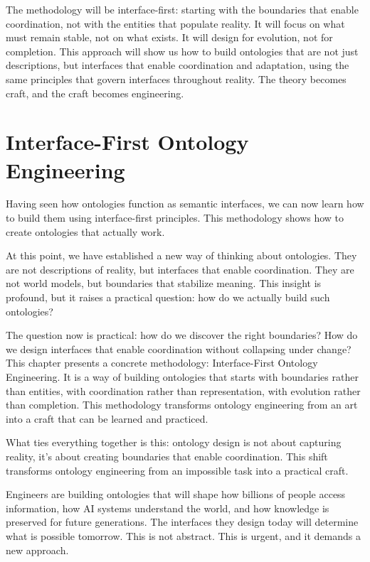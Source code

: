 \documentclass[
  openright]{book}
\begin{document}
The methodology will be interface-first: starting with the boundaries
that enable coordination, not with the entities that populate reality.
It will focus on what must remain stable, not on what exists. It will
design for evolution, not for completion. This approach will show us how
to build ontologies that are not just descriptions, but interfaces that
enable coordination and adaptation, using the same principles that
govern interfaces throughout reality. The theory becomes craft, and the
craft becomes engineering.

\chapter{\texorpdfstring{Interface-First Ontology
Engineering}{Interface-First Ontology Engineering}}\label{interface-first-ontology-engineering}

Having seen how ontologies function as semantic interfaces, we can now
learn how to build them using interface-first principles. This
methodology shows how to create ontologies that actually work.

At this point, we have established a new way of thinking about
ontologies. They are not descriptions of reality, but interfaces that
enable coordination. They are not world models, but boundaries that
stabilize meaning. This insight is profound, but it raises a practical
question: how do we actually build such ontologies?

The question now is practical: how do we discover the right boundaries?
How do we design interfaces that enable coordination without collapsing
under change? This chapter presents a concrete methodology:
Interface-First Ontology Engineering. It is a way
of building ontologies that starts with boundaries rather than entities,
with coordination rather than representation, with evolution rather than
completion. This methodology transforms ontology engineering from an art
into a craft that can be learned and practiced.

What ties everything together is this: ontology design is not about
capturing reality, it's about creating boundaries that enable
coordination. This shift transforms ontology engineering from an
impossible task into a practical craft.

Engineers are building ontologies that will shape how billions of people
access information, how AI systems understand the world, and how
knowledge is preserved for future generations. The interfaces they
design today will determine what is possible tomorrow. This is not
abstract. This is urgent, and it demands a new approach.
\end{document}
